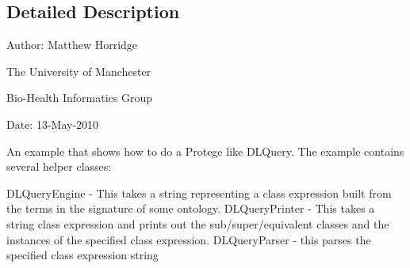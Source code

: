 \subsection{Detailed Description}
Author\-: Matthew Horridge\par
 The University of Manchester\par
 Bio-\/\-Health Informatics Group\par
 Date\-: 13-\/\-May-\/2010 \par
 An example that shows how to do a Protege like D\-L\-Query. The example contains several helper classes\-:\par
 D\-L\-Query\-Engine -\/ This takes a string representing a class expression built from the terms in the signature of some ontology. D\-L\-Query\-Printer -\/ This takes a string class expression and prints out the sub/super/equivalent classes and the instances of the specified class expression. D\-L\-Query\-Parser -\/ this parses the specified class expression string 

